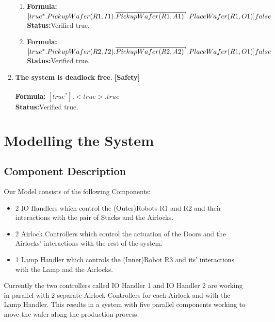 \documentclass[a4paper,12pt]{article}
\begin{document}
\begin{enumerate}
\begin{enumerate}
			\item \textbf{Formula:} $[true^* . PickupWafer(R1, I1) .\overline{PickupWafer(R1, A1)}^* . 
			\\PlaceWafer(R1, O1)] false $
			\\\textbf{Status:}Verified true.
			
			\item \textbf{Formula:} $[true^* . PickupWafer(R2, I2) .\overline{PickupWafer(R2, A2)}^* . 
			\\PlaceWafer(R1, O1)] false $
			\\\textbf{Status:}Verified true.
			
		\end{enumerate}
		\item \textbf{The system is deadlock free}. \textbf{[Safety]}
		\\
		\\\textbf{Formula:} $[true^*]. <true> . true$
		\\\textbf{Status:}Verified true.
	\end{enumerate}
	
	\newpage
	\section{Modelling the System}
	\subsection{Component Description}
	Our Model consists of the following Components:
	\begin{itemize}
		\item 2 IO Handlers which control the (Outer)Robots R1 and R2 and their interactions with the pair of Stacks and the Airlocks.
		\item 2 Airlock Controllers which control the actuation of the Doors and the Airlocks' interactions with the rest of the system.
		\item 1 Lamp Handler which controls the (Inner)Robot R3 and its' interactions with the Lamp and the Airlocks.
	\end{itemize}
	Currently the two controllers called IO Handler 1 and IO Handler 2 are working in parallel with 2 separate Airlock Controllers for each Airlock and with the Lamp Handler. This results in a system with five parallel components working to move the wafer along the production process. 
\end{document}
